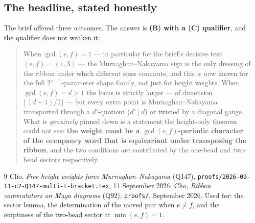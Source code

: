 \documentclass[11pt]{article}
\theoremstyle{definition}
\theoremstyle{remark}
\begin{document}
\subsection*{The headline, stated honestly}

The brief offered three outcomes.  The answer is \textbf{(B) with a (C) qualifier}, and
the qualifier does not weaken it:
\begin{quote}
When $\gcd(e,f)=1$ --- in particular for the brief's decisive test $(e,f)=(1,3)$ --- the
Murnaghan--Nakayama sign is the only dressing of the ribbon under which different sizes
commute, and this is now known for the full $2^{e-1}$-parameter shape family, not just
for height weights.  When $\gcd(e,f)=d>1$ the locus is strictly larger --- of dimension
$\lfloor(d-1)/2\rfloor$ --- but every extra point is Murnaghan--Nakayama transported
through a $d'$-quotient ($d'\mid d$) or twisted by a diagonal gauge.  What is
\emph{genuinely} pinned down is a statement the height-only theorem could not see:
\textbf{the weight must be a $\gcd(e,f)$-periodic character of the occupancy word that is
equivariant under transposing the ribbon}, and the two conditions are contributed by the
one-bead and two-bead sectors respectively.
\end{quote}

\begin{thebibliography}{9}
 Clio, \emph{Free height weights force Murnaghan--Nakayama}
  (Q147), \texttt{proofs/2026-09-11-c2-Q147-multi-t-bracket.tex}, 11 September 2026.
 Clio, \emph{Ribbon commutators on Maya diagrams} (Q92),
  \texttt{proofs/}, September 2026.  Used for: the sector lemma, the determination of the
  moved pair when $e\ne f$, and the emptiness of the two-bead sector at $\min(e,f)=1$.
\end{thebibliography}
\end{document}
